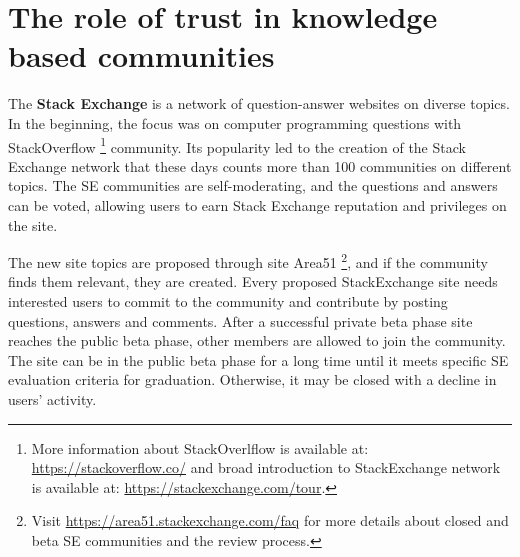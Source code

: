 
\chapter{The role of trust in knowledge based communities} %
\label{Ch:Trust}


The \textbf{Stack Exchange} is a network of question-answer websites on diverse topics. In the beginning, the focus was on computer programming questions with StackOverflow \footnote{
	More information about StackOverlflow is available at: \url{https://stackoverflow.co/} and broad introduction to StackExchange network is available at: \url{https://stackexchange.com/tour}. 
}  community. Its popularity led to the creation of the Stack Exchange network that these days counts more than 100 communities on different topics. The SE communities are self-moderating, and the questions and answers can be voted, allowing users to earn Stack Exchange reputation and privileges on the site. 

The new site topics are proposed through site Area51 \footnote{Visit \url{https://area51.stackexchange.com/faq} for more details about closed and beta SE communities and the review process.}, and if the community finds them relevant, they are created. Every proposed  StackExchange site needs interested users to commit to the community and contribute by posting questions, answers and comments. After a successful private beta phase site reaches the public beta phase, other members are allowed to join the community. The site can be in the public beta phase for a long time until it meets specific SE evaluation criteria for graduation. Otherwise, it may be closed with a decline in users' activity. 

